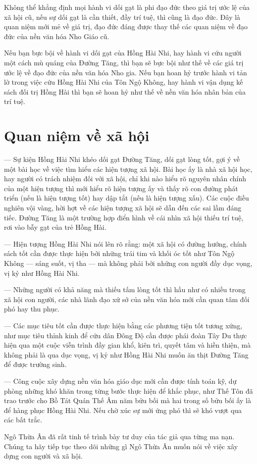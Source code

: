 Không thể khẳng định mọi hành vi dối gạt là phi đạo đức theo giá trị ước lệ của xã hội cũ, nếu sự dối gạt là cần thiết, đầy trí tuệ, thì cũng là đạo đức. Đây là quan niệm mới mẻ về giá trị, đạo đức đáng được thay thế các quan niệm về đạo đức của nền văn hóa Nho Giáo cũ.

Nếu bạn bực bội về hành vi dối gạt của Hồng Hài Nhi, hay hành vi cứu người một cách mù quáng của Đường Tăng, thì bạn sẽ bực bội như thế về các giá trị ước lệ về đạo đức của nền văn hóa Nho gia. Nếu bạn hoan hỷ trước hành vi tản lờ trong việc cứu Hồng Hài Nhi của Tôn Ngộ Không, hay hành vi vận dụng kế sách đối trị Hồng Hài thì bạn sẽ hoan hỷ như thế về nền văn hóa nhân bản của trí tuệ.

\section{Quan niệm về xã hội} %
\label{sec:40_41_xa_hoi}

--- Sự kiện Hồng Hài Nhi khéo dối gạt Đường Tăng, dối gạt lòng tốt, gợi ý về một bài học về việc tìm hiểu các hiện tượng xã hội. Bài học ấy là nhà xã hội học, hay người có trách nhiệm đối với xã hội, chỉ khi nào hiểu rõ nguyên nhân chính của một hiện tượng thì mới hiểu rõ hiện tượng ấy và thấy rõ con đường phát triển (nếu là hiện tượng tốt) hay dập tắt (nếu là hiện tượng xấu). Các cuộc điều nghiên vội vàng, hời hợt về các hiện tượng xã hội sẽ dẫn đến các sai lầm đáng tiếc. Đường Tăng là một trường hợp điển hình về cái nhìn xã hội thiếu trí tuệ, rơi vào bẫy gạt của trẻ Hồng Hài.

--- Hiện tượng Hồng Hài Nhi nói lên rõ rằng: một xã hội có đường hướng, chính sách tốt cần được thực hiện bởi những trái tim và khối óc tốt như Tôn Ngộ Không --- sáng suốt, vị tha --- mà không phải bởi những con người đầy dục vọng, vị kỷ như Hồng Hài Nhi.

--- Những người có khả năng mà thiếu tấm lòng tốt thì hầu như có nhiều trong xã hội con người, các nhà lãnh đạo xứ sở của nền văn hóa mới cần quan tâm đối phó hay thu phục.

--- Các mục tiêu tốt cần được thực hiện bằng các phương tiện tốt tương xứng, như mục tiêu thỉnh kinh để cứu dân Đông Độ cần được phái đoàn Tây Du thực hiện qua một cuộc viễn trình đầy gian khổ, kiên trì, quyết tâm và hiền thiện, mà không phải là qua dục vọng, vị kỷ như Hồng Hài Nhi muốn ăn thịt Đường Tăng để được trường sinh.

--- Công cuộc xây dựng nền văn hóa giáo dục mới cần được tính toán kỹ, dự phòng những khó khăn trong từng bước thực hiện để khắc phục, như Thế Tôn đã trao trước cho Bồ Tát Quán Thế Âm năm bửu bối mà hai trong số bửu bối ấy là để hàng phục Hồng Hài Nhi. Nếu chờ xúc sự mới ứng phó thì sẽ khó vượt qua các bất trắc.

Ngô Thừa Ân đã rất tinh tế trình bày tư duy của tác giả qua từng ma nạn. Chúng ta hãy tiếp tục theo dõi những gì Ngô Thừa Ân muốn nói về việc xây dựng con người và xã hội.

